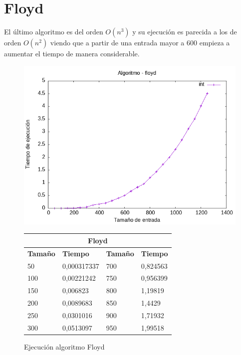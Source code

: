 \documentclass[11pt,openany]{book}
\begin{document}
\section*{Floyd}
El último algoritmo es del orden $O(n^3)$ y su ejecución es parecida a los de orden $O(n^2)$ viendo que a partir de una entrada mayor a 
600 empieza a aumentar el tiempo de manera considerable.
\begin{figure}[H]
    \begin{minipage}{0.5\textwidth}
        \centering
        \includegraphics[width=\linewidth]{assets/Img/floydint.png}
        \caption{Ejecución algoritmo Floyd}
        \label{fig:floyd}
    \end{minipage}
    \begin{minipage}{0.5\textwidth}
        \centering
        \small
        \begin{tabular}{|l|l|l|l|}
        \hline
        \multicolumn{4}{|c|}{\cellcolor{blue!20}\textbf{Floyd}} \\ \hline 
        \textbf{Tamaño} & \textbf{Tiempo} & \textbf{Tamaño} & \textbf{Tiempo} \\ \hline
        50 & 0,000317337 & 700 & 0,824563 \\ \hline
        100 & 0,00221242 & 750 & 0,956399 \\ \hline
        150 & 0,006823 & 800 & 1,19819 \\ \hline
        200 & 0,0089683 & 850 & 1,4429 \\ \hline
        250 & 0,0301016 & 900 & 1,71932 \\ \hline
        300 & 0,0513097 & 950 & 1,99518 \\ \hline

\end{tabular}
\end{minipage}
\end{figure}
\end{document}

